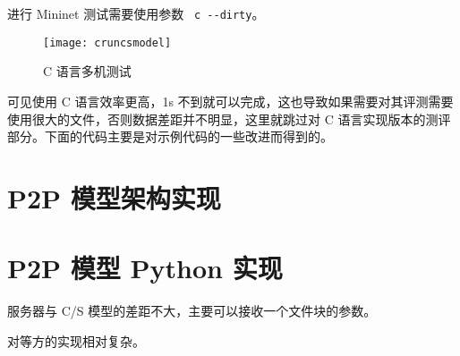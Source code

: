 进行 Mininet 测试需要使用参数 \verb" c --dirty"。

\begin{figure}[H]
    \centering
    \texttt{[image: cruncsmodel]}
    \caption{C 语言多机测试}
\end{figure}

可见使用 C 语言效率更高，1s 不到就可以完成，这也导致如果需要对其评测需要使用很大的文件，否则数据差距并不明显，这里就跳过对 C 语言实现版本的测评部分。下面的代码主要是对示例代码的一些改进而得到的。



\section{P2P 模型架构实现}


\section{P2P 模型 Python 实现 \faPython}

服务器与 C/S 模型的差距不大，主要可以接收一个文件块的参数。


对等方的实现相对复杂。



